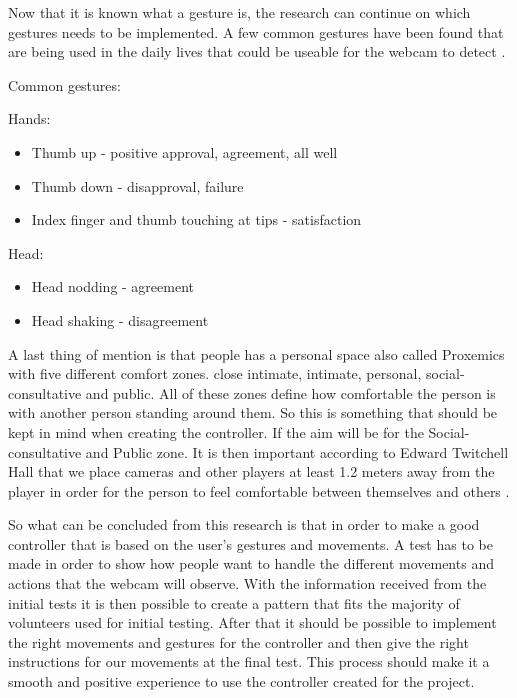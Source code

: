 Now that it is known what a gesture is, the research can continue on which gestures needs to be implemented. A few common gestures have been found that are being used in the daily lives that could be useable for the webcam to detect \parencite{Businessballs}.
\bigskip

Common gestures:

Hands:
\begin{itemize}
\item Thumb up - positive approval, agreement, all well
\item Thumb down - disapproval, failure
\item Index finger and thumb touching at tips - satisfaction
\end{itemize}

Head:
\begin{itemize}
\item Head nodding - agreement
\item Head shaking - disagreement
\end{itemize}
\bigskip

A last thing of mention is that people has a personal space also called Proxemics with five different comfort zones. close intimate, intimate, personal, social-consultative and public. All of these zones define how comfortable the person is with another person standing around them. So this is something that should be kept in mind when creating the controller. If the aim will be for the Social-consultative and Public zone. It is then important according to Edward Twitchell Hall that we place cameras and other players at least 1.2 meters away from the player in order for the person to feel comfortable between themselves and others \parencite{Businessballs}.

So what can be concluded from this research is that in order to make a good controller that is based on the user’s gestures and movements. A test has to be made in order to show how people want to handle the different movements and actions that the webcam will observe. With the information received from the initial tests it is then possible to create a pattern that fits the majority of volunteers used for initial testing. After that it should be possible to implement the right movements and gestures for the controller and then give the right instructions for our movements at the final test.  This process should make it a smooth and positive experience to use the controller created for the project.

